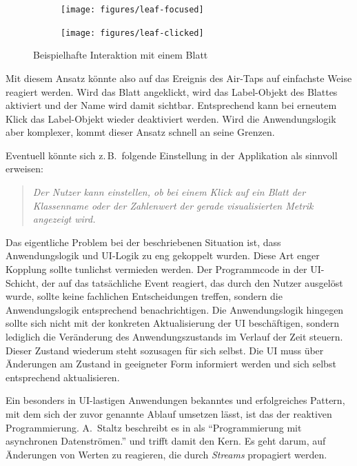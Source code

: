 \setlength{\fwidth}{.49\textwidth}
\begin{figure}[htb]
  \centering
  \begin{subfigure}[b]{\fwidth}
   \texttt{[image: figures/leaf-focused]}
    \label{fig:leaf-focused}
  \end{subfigure}
  \hfill
  \begin{subfigure}[b]{\fwidth}
  	\texttt{[image: figures/leaf-clicked]}
  	 \label{fig:leaf-clicked}
  \end{subfigure}
  \caption{Beispielhafte Interaktion mit einem Blatt} \label{fig:leaf-interaction}
\end{figure}

Mit diesem Ansatz könnte also auf das Ereignis des Air-Taps auf einfachste Weise reagiert werden. Wird das Blatt angeklickt, wird das Label-Objekt des Blattes aktiviert und der Name wird damit sichtbar. Entsprechend kann bei erneutem Klick das Label-Objekt wieder deaktiviert werden. Wird die Anwendungslogik aber komplexer, kommt dieser Ansatz schnell an seine Grenzen.

Eventuell könnte sich z.\,B.\ folgende Einstellung in der Applikation als sinnvoll erweisen:

\begin{quotation}
  \textit{Der Nutzer kann einstellen, ob bei einem Klick auf ein Blatt der Klassenname oder der Zahlenwert der gerade visualisierten Metrik angezeigt wird.}
\end{quotation}

Das eigentliche Problem bei der beschriebenen Situation ist, dass Anwendungslogik und UI-Logik zu eng gekoppelt wurden. Diese Art enger Kopplung sollte tunlichst vermieden werden. Der Programmcode in der UI-Schicht, der auf das tatsächliche Event reagiert, das durch den Nutzer ausgelöst wurde, sollte keine fachlichen Entscheidungen treffen, sondern die Anwendungslogik entsprechend benachrichtigen. Die Anwendungslogik hingegen sollte sich nicht mit der konkreten Aktualisierung der UI beschäftigen, sondern lediglich die Veränderung des Anwendungszustands im Verlauf der Zeit steuern. Dieser Zustand wiederum steht sozusagen für sich selbst. Die UI muss über Änderungen am Zustand in geeigneter Form informiert werden und sich selbst entsprechend aktualisieren.

Ein besonders in UI-lastigen Anwendungen bekanntes und erfolgreiches Pattern, mit dem sich der zuvor genannte Ablauf umsetzen lässt, ist das der reaktiven Programmierung. A.\ Staltz beschreibt es in \cite{staltz2016introduction} als "`Programmierung mit asynchronen Datenströmen."' und trifft damit den Kern. Es geht darum, auf Änderungen von Werten zu reagieren, die durch \textit{Streams} propagiert werden.

